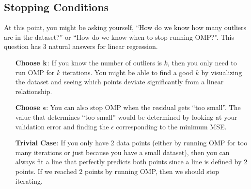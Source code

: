   \subsection{Stopping Conditions}
  At this point, you might be asking yourself, ``How do we know how many outliers are in the dataset?'' or ``How do we know when to stop running OMP?''.
  This question has 3 natural answers for linear regression.
  \begin{enumerate}
	\item[\textbf{Choose $\mathbf{k}$}:] If you know the number of outliers is $k$, then you only need to run OMP for $k$ iterations. You might be able to find a good $k$ by visualizing the dataset and seeing which points deviate significantly from a linear relationship.
	\item[\textbf{Choose $\boldsymbol{\epsilon}$}:] You can also stop OMP when the residual gets ``too small''. The value that determines ``too small'' would be determined by looking at your validation error and finding the $\epsilon$ corresponding to the minimum MSE.
	\item[\textbf{Trivial Case}:] If you only have 2 data points (either by running OMP for too many iterations or just because you have a small dataset), then you can always fit a line that perfectly predicts both points since a line is defined by 2 points. If we reached 2 points by running OMP, then we should stop iterating.
  \end{enumerate}

